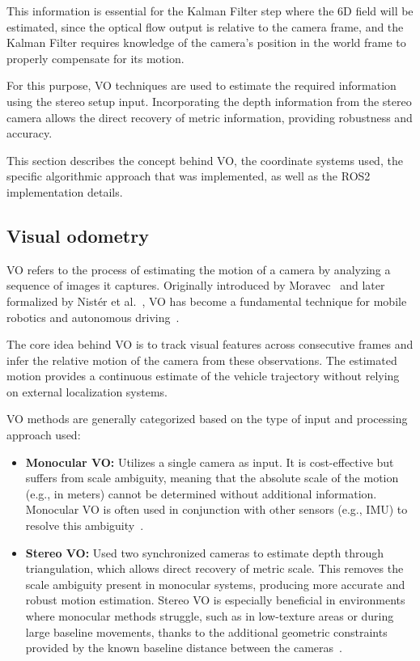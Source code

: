 This information is essential for the Kalman Filter step where the 6D field will be estimated, since the optical flow output 
is relative to the camera frame, and the Kalman Filter requires knowledge of the camera's position in the world frame
to properly compensate for its motion.

For this purpose, \gls{VO} techniques are used to estimate the required information
using the stereo setup input. Incorporating the depth information from the stereo camera allows the
direct recovery of metric information, providing robustness and accuracy.

This section describes the concept behind \gls{VO}, the coordinate systems used, the specific
algorithmic approach that was implemented, as well as the ROS2 implementation details.

\subsection{Visual odometry}
\label{sec:VisualOdometryConcept}

\gls{VO} refers to the process of estimating the motion of a camera by analyzing a
sequence of images it captures. Originally introduced by Moravec~\cite{vo_moravec} and later
formalized by Nist\'er et al.~\cite{vo_nister}, \gls{VO} has become a fundamental technique for mobile
robotics and autonomous driving~\cite{visual_odometry_review}.

The core idea behind \gls{VO} is to track visual features across consecutive frames and infer the relative
motion of the camera from these observations. The estimated motion provides a continuous estimate
of the vehicle trajectory without relying on external localization systems.

\gls{VO} methods are generally categorized based on the type of input and processing
approach used:

\begin{itemize}
  \item \textbf{Monocular \gls{VO}:} Utilizes a single camera as input. It is cost-effective but suffers from
  scale ambiguity, meaning that the absolute scale of the motion (e.g., in meters) cannot be determined
  without additional information. Monocular \gls{VO} is often used in conjunction with other sensors
  (e.g., \gls{IMU}) to resolve this ambiguity~\cite{visual_odometry_review}.

  \item \textbf{Stereo \gls{VO}:} Used two synchronized cameras to estimate depth through triangulation,
  which allows direct recovery of metric scale. This removes the scale ambiguity present in monocular
  systems, producing more accurate and robust motion estimation. Stereo \gls{VO} is especially beneficial
  in environments where monocular methods struggle, such as in low-texture areas or during large
  baseline movements, thanks to the additional geometric constraints provided by the known baseline
  distance between the cameras~\cite{visual_odometry_review}.

\end{itemize}

